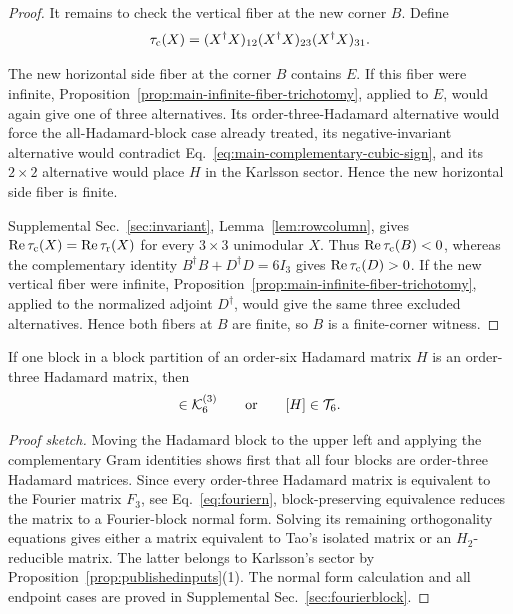 \begin{proof}
It remains to check the vertical fiber at the new corner $B$. Define
\begin{equation}
    \tau_{\rm c}(X)
=(X^\dagger X)_{12}(X^\dagger X)_{23}(X^\dagger X)_{31}.
\end{equation}

The new horizontal side fiber at the corner $B$ contains $E$. If this fiber were infinite, Proposition~\ref{prop:main-infinite-fiber-trichotomy}, applied to $E$, would again give one of three alternatives.
Its order-three-Hadamard alternative would force the all-Hadamard-block case already treated, its negative-invariant alternative would contradict Eq.~\eqref{eq:main-complementary-cubic-sign}, and its $2\times2$ alternative would place $H$ in the Karlsson sector. Hence the new horizontal side fiber is finite.

Supplemental Sec.~\ref{sec:invariant}, Lemma~\ref{lem:rowcolumn}, gives $\operatorname{Re}\tau_{\rm c}(X)=\operatorname{Re}\tau_{\rm r}(X)$  for every $3\times3$ unimodular $X$. Thus $\operatorname{Re}\tau_{\rm c}(B)<0$, whereas the complementary identity $B^\dagger B+D^\dagger D=6I_3$ gives $\operatorname{Re}\tau_{\rm c}(D)>0$. 
If the new vertical fiber were infinite, Proposition~\ref{prop:main-infinite-fiber-trichotomy}, applied to the normalized adjoint $D^\dagger$, would give the same three excluded alternatives. Hence both fibers at $B$ are finite, so $B$ is a finite-corner witness.
\end{proof}

\begin{proposition}
\label{prop:main-fourier-block}
If one block in a block partition of an order-six Hadamard matrix $H$ is
an order-three Hadamard matrix, then
\begin{equation}
[H]\in\KK_6^{(3)}
\qquad\text{or}\qquad
[H]\in\mathcal T_6.
\label{eq:main-fourier-block-alternative}
\end{equation}
\end{proposition}

\begin{proof}[Proof sketch]
Moving the Hadamard block to the upper left and applying the complementary Gram identities shows first that all four blocks are order-three Hadamard matrices. Since every order-three Hadamard matrix is equivalent to the Fourier matrix $F_3$, see Eq.~\ref{eq:fouriern}, block-preserving equivalence reduces the matrix to a Fourier-block normal form. Solving its remaining orthogonality equations gives either a matrix equivalent to Tao's isolated matrix or an $H_2$-reducible matrix. The latter belongs to Karlsson's sector by Proposition~\ref{prop:publishedinputs}(1). The normal form calculation and all endpoint cases are proved in Supplemental Sec.~\ref{sec:fourierblock}.
\end{proof}

